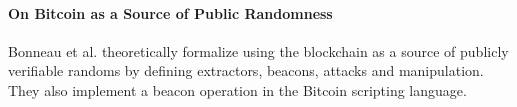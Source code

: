 \paragraph{On Bitcoin as a Source of Public Randomness}
Bonneau et al. \cite{bonneau2015bitcoin} theoretically formalize using the blockchain as a source of publicly verifiable randoms by defining extractors, beacons, attacks and manipulation. They also implement a beacon operation in the Bitcoin scripting language.  